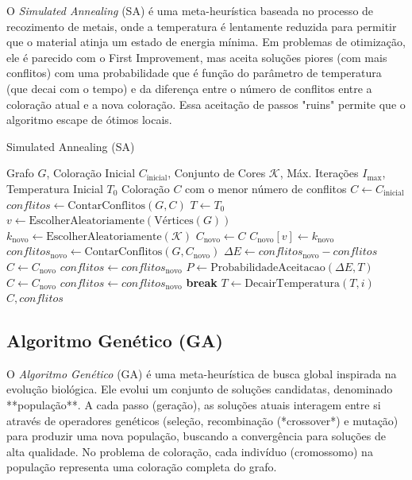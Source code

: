 \documentclass[12pt,a4paper]{article}
\begin{document}
O \textit{Simulated Annealing} (SA) é uma meta-heurística baseada no processo de recozimento de metais, onde a temperatura é lentamente reduzida para permitir que o material atinja um estado de energia mínima. Em problemas de otimização, ele é parecido com o First Improvement, mas aceita soluções piores (com mais conflitos) com uma probabilidade que é função do parâmetro de temperatura (que decai com o tempo) e da diferença entre o número de conflitos entre a coloração atual e a nova coloração. Essa aceitação de passos "ruins" permite que o algoritmo escape de ótimos locais.
\begin{algorithm}
\caption{Simulated Annealing (SA)}
\label{alg:simulated_annealing}
\begin{algorithmic}[1]
\REQUIRE Grafo $G$, Coloração Inicial $C_{\text{inicial}}$, Conjunto de Cores $\mathcal{K}$, Máx. Iterações $I_{\max}$, Temperatura Inicial $T_0$
\ENSURE Coloração $C$ com o menor número de conflitos
\STATE $C \gets C_{\text{inicial}}$
\STATE $conflitos \gets \text{ContarConflitos}(G, C)$
\STATE $T \gets T_0$
    \STATE $v \gets \text{EscolherAleatoriamente}(\text{Vértices}(G))$
    \STATE $k_{\text{novo}} \gets \text{EscolherAleatoriamente}(\mathcal{K})$
    \STATE $C_{\text{novo}} \gets C$
    \STATE $C_{\text{novo}}[v] \gets k_{\text{novo}}$
    \STATE $conflitos_{\text{novo}} \gets \text{ContarConflitos}(G, C_{\text{novo}})$
    \STATE $\Delta E \gets conflitos_{\text{novo}} - conflitos$ 
     
        \STATE $C \gets C_{\text{novo}}$
        \STATE $conflitos \gets conflitos_{\text{novo}}$
    \ELSE {}
        \STATE $P \gets \text{ProbabilidadeAceitacao}(\Delta E, T)$
            \STATE $C \gets C_{\text{novo}}$ 
            \STATE $conflitos \gets conflitos_{\text{novo}}$
        \ENDIF
    \ENDIF
        \STATE \textbf{break}
    \ENDIF
    \STATE $T \gets \text{DecairTemperatura}(T, i)$
\ENDFOR
\RETURN $C, conflitos$
\end{algorithmic}
\end{algorithm}

\subsection{Algoritmo Genético (GA)}

O \textit{Algoritmo Genético} (GA) é uma meta-heurística de busca global inspirada na evolução biológica. Ele evolui um conjunto de soluções candidatas, denominado **população**. A cada passo (geração), as soluções atuais interagem entre si através de operadores genéticos (seleção, recombinação (*crossover*) e mutação) para produzir uma nova população, buscando a convergência para soluções de alta qualidade. No problema de coloração, cada indivíduo (cromossomo) na população representa uma coloração completa do grafo.
\end{document}
